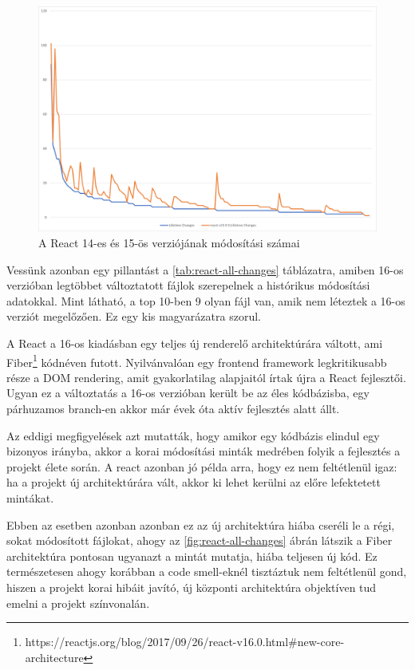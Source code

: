 \begin{figure}[H]
    \centering
    \includegraphics[width=1\textwidth]{images/react/react-14-15-changes.png}
    \caption{A React 14-es és 15-ös verziójának módosítási számai}
    \label{fig:react-14-15-changes}
\end{figure}

Vessünk azonban egy pillantást a \ref{tab:react-all-changes} táblázatra, amiben 16-os verzióban legtöbbet változtatott fájlok szerepelnek a histórikus módosítási adatokkal. Mint látható, a top 10-ben 9 olyan fájl van, amik nem léteztek a 16-os verziót megelőzően. Ez egy kis magyarázatra szorul.

A React a 16-os kiadásban egy teljes új renderelő architektúrára váltott, ami Fiber\footnote{https://reactjs.org/blog/2017/09/26/react-v16.0.html\#new-core-architecture} kódnéven futott. Nyilvánvalóan egy frontend framework legkritikusabb része a DOM rendering, amit gyakorlatilag alapjaitól írtak újra a React fejlesztői. Ugyan ez a változtatás a 16-os verzióban került be az éles kódbázisba, egy párhuzamos branch-en akkor már évek óta aktív fejlesztés alatt állt.

Az eddigi megfigyelések azt mutatták, hogy amikor egy kódbázis elindul egy bizonyos irányba, akkor a korai módosítási minták medrében folyik a fejlesztés a projekt élete során. A react azonban jó példa arra, hogy ez nem feltétlenül igaz: ha a projekt új architektúrára vált, akkor ki lehet kerülni az előre lefektetett mintákat.

Ebben az esetben azonban azonban ez az új architektúra hiába cseréli le a régi, sokat módosított fájlokat, ahogy az \ref{fig:react-all-changes} ábrán látszik a Fiber architektúra pontosan ugyanazt a mintát mutatja, hiába teljesen új kód. Ez természetesen ahogy korábban a code smell-eknél tisztáztuk nem feltétlenül gond, hiszen a projekt korai hibáit javító, új központi architektúra objektíven tud emelni a projekt színvonalán.

